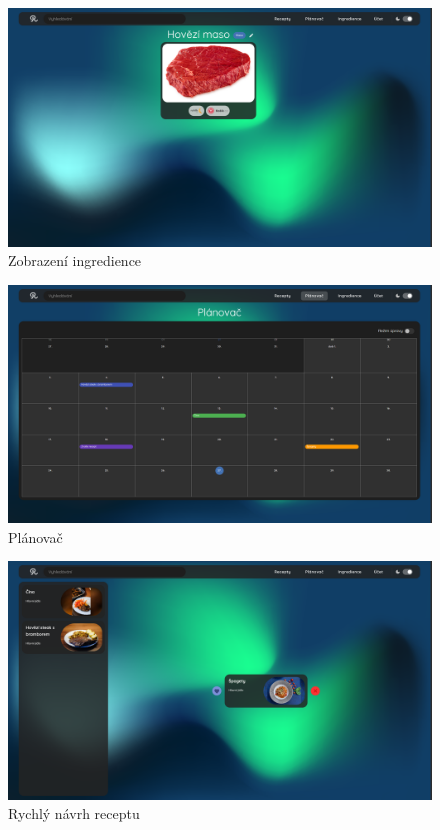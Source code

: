 \begin{figure}[H]
    \includegraphics[width=\textwidth]{images/final-look/zobrazeni-suroviny}
    \caption{Zobrazení ingredience} \label{picture:recipeo:zobrazeni-suroviny}
\end{figure}

\begin{figure}[H]
    \includegraphics[width=\textwidth]{images/final-look/planovac}
    \caption{Plánovač} \label{picture:recipeo:planovac}
\end{figure}

\begin{figure}[H]
    \includegraphics[width=\textwidth]{images/final-look/rychly-navrh}
    \caption{Rychlý návrh receptu} \label{picture:recipeo:rychly-navrh}
\end{figure}

